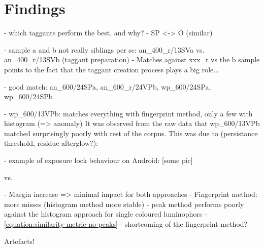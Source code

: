\documentclass[thesis.tex]{subfiles}
\begin{document}
\section{Findings}
- which taggants perform the best, and why?
- SP <-> O (similar)

- sample a and b not really siblings per se: an\_400\_r/13SVa vs. an\_400\_r/13SVb (taggant preparation)
- Matches against xxx\_r vs the b sample points to the fact that the taggant creation process plays a big role...

- good match: an\_600/24SPa, an\_600\_r/24VPb, wp\_600/24SPa, wp\_600/24SPb

- wp\_600/13VPb: matches everything with fingerprint method, only a few with histogram (=> anomaly)
It was observed from the raw data that wp\_600/13VPb matched surprisingly poorly with rest of the corpus. This was due to (persistance threshold, residue afterglow?):

- example of exposure lock behaviour on Android: [some pic]

vs.

- Margin increase => minimal impact for both approaches
- Fingerprint method: more misses (histogram method more stable)
- peak method performs poorly against the histogram approach for single coloured luminophors
- \ref{equation:similarity-metric-no-peaks} - shortcoming of the fingerprint method?

Artefacts!
\end{document}
